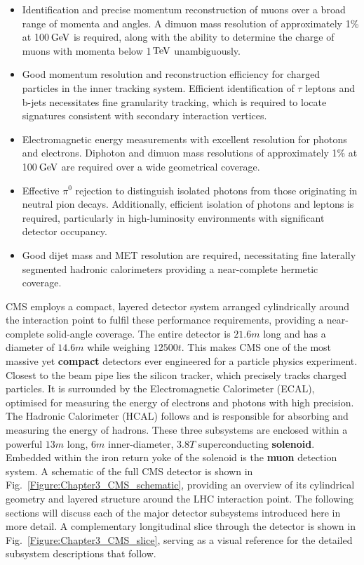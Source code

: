 \begin{itemize}
    \item Identification and precise momentum reconstruction of muons over a broad range of momenta and angles. A dimuon mass resolution of approximately 1\% at 100$\,\text{Ge\hspace{-.08em}V}$ is required, along with the ability to determine the charge of muons with momenta below 1$\,\text{Te\hspace{-.08em}V}$ unambiguously.

    \item Good momentum resolution and reconstruction efficiency for charged particles in the inner tracking system. Efficient identification of $\tau$ leptons and b-jets necessitates fine granularity tracking, which is required to locate signatures consistent with secondary interaction vertices.

    \item Electromagnetic energy measurements with excellent resolution for photons and electrons. Diphoton and dimuon mass resolutions of approximately 1\% at 100$\,\text{Ge\hspace{-.08em}V}$ are required over a wide geometrical coverage.

    \item Effective $\pi^0$ rejection to distinguish isolated photons from those originating in neutral pion decays. Additionally, efficient isolation of photons and leptons is required, particularly in high-luminosity environments with significant detector occupancy.

    \item Good dijet mass and \ac{MET} resolution are required, necessitating fine laterally segmented hadronic calorimeters providing a near-complete hermetic coverage.
\end{itemize}

CMS employs a compact, layered detector system arranged cylindrically around the interaction point to fulfil these performance requirements, providing a near-complete solid-angle coverage. The entire detector is $21.6\unit{m}$ long and has a diameter of $14.6\unit{m}$ while weighing $12500\unit{t}$. This makes CMS one of the most massive yet \textbf{compact} detectors ever engineered for a particle physics experiment. Closest to the beam pipe lies the silicon tracker, which precisely tracks charged particles. It is surrounded by the Electromagnetic Calorimeter (ECAL), optimised for measuring the energy of electrons and photons with high precision. The Hadronic Calorimeter (HCAL) follows and is responsible for absorbing and measuring the energy of hadrons. These three subsystems are enclosed within a powerful $13\unit{m}$ long, $6\unit{m}$ inner-diameter, $3.8\unit{T}$ superconducting \textbf{solenoid}. Embedded within the iron return yoke of the solenoid is the \textbf{muon} detection system. A schematic of the full CMS detector is shown in Fig.~\ref{Figure:Chapter3_CMS_schematic}, providing an overview of its cylindrical geometry and layered structure around the LHC interaction point. The following sections will discuss each of the major detector subsystems introduced here in more detail. A complementary longitudinal slice through the detector is shown in Fig.~\ref{Figure:Chapter3_CMS_slice}, serving as a visual reference for the detailed subsystem descriptions that follow.

